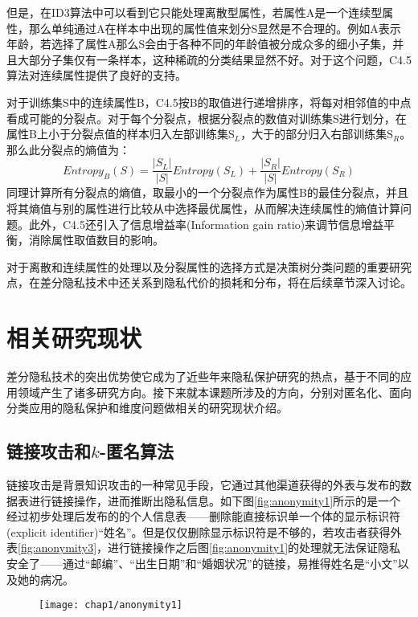 但是，在ID3算法中可以看到它只能处理离散型属性，若属性A是一个连续型属性，那么单纯通过A在样本中出现的属性值来划分S显然是不合理的。例如A表示年龄，若选择了属性A那么S会由于各种不同的年龄值被分成众多的细小子集，并且大部分子集仅有一条样本，这种稀疏的分类结果显然不好。对于这个问题，C4.5算法对连续属性提供了良好的支持。

对于训练集S中的连续属性B，C4.5按B的取值进行递增排序，将每对相邻值的中点看成可能的分裂点。对于每个分裂点，根据分裂点的数值对训练集S进行划分，在属性B上小于分裂点值的样本归入左部训练集S$_{L}$，大于的部分归入右部训练集S$_{R}$。那么此分裂点的熵值为：
\[
	Entropy_{B}(S) = \frac{|S_{L}|}{|S|}Entropy(S_{L})+\frac{|S_{R}|}{|S|}Entropy(S_{R})
\]
同理计算所有分裂点的熵值，取最小的一个分裂点作为属性B的最佳分裂点，并且将其熵值与别的属性进行比较从中选择最优属性，从而解决连续属性的熵值计算问题。此外，C4.5还引入了信息增益率(Information gain ratio)来调节信息增益平衡，消除属性取值数目的影响。

对于离散和连续属性的处理以及分裂属性的选择方式是决策树分类问题的重要研究点，在差分隐私技术中还关系到隐私代价的损耗和分布，将在后续章节深入讨论。

\section{相关研究现状} %

差分隐私技术的突出优势使它成为了近些年来隐私保护研究的热点，基于不同的应用领域产生了诸多研究方向。接下来就本课题所涉及的方向，分别对匿名化、面向分类应用的隐私保护和维度问题做相关的研究现状介绍。

\subsection{链接攻击和$k$-匿名算法}  %

链接攻击是背景知识攻击\cite{compounding attack}\cite{background attack}的一种常见手段，它通过其他渠道获得的外表与发布的数据表进行链接操作，进而推断出隐私信息。如下图\ref{fig:anonymity1}所示的是一个经过初步处理后发布的的个人信息表——删除能直接标识单一个体的显示标识符(explicit identifier)“姓名”。但是仅仅删除显示标识符是不够的，若攻击者获得外表\ref{fig:anonymity3}，进行链接操作之后图\ref{fig:anonymity1}的处理就无法保证隐私安全了——通过“邮编”、“出生日期”和“婚姻状况”的链接，易推得姓名是“小文”以及她的病况。

\begin{figure}[!htp]
	\centering
	\texttt{[image: chap1/anonymity1]}
\end{figure}

